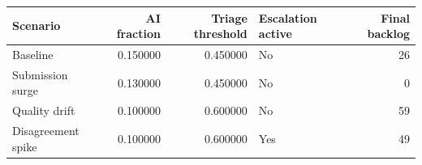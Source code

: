 \begin{tabular}{lrrlr}
\toprule
Scenario & AI fraction & Triage threshold & Escalation active & Final backlog \\
\midrule
Baseline & 0.150000 & 0.450000 & No & 26 \\
Submission surge & 0.130000 & 0.450000 & No & 0 \\
Quality drift & 0.100000 & 0.600000 & No & 59 \\
Disagreement spike & 0.100000 & 0.600000 & Yes & 49 \\
\bottomrule
\end{tabular}
